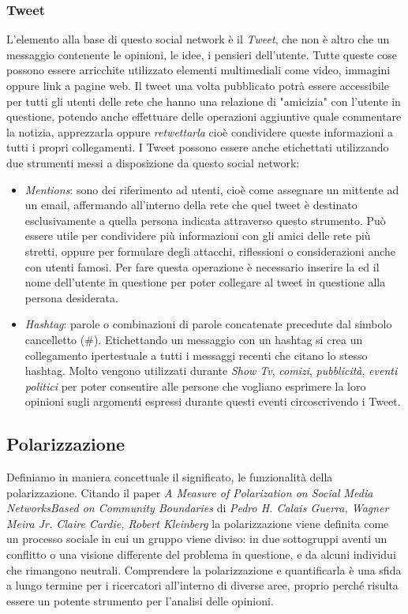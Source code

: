 \subsubsection{Tweet}
L'elemento alla base di questo social network è il \textit{Tweet}, che non è altro che un messaggio contenente le opinioni, le idee, i pensieri dell'utente. Tutte queste cose possono essere arricchite utilizzato elementi multimediali come video, immagini oppure link a pagine web. Il tweet una volta pubblicato potrà essere accessibile per tutti gli utenti delle rete che hanno una relazione di "amicizia" con l'utente in questione, potendo anche effettuare delle operazioni aggiuntive quale commentare la notizia, apprezzarla oppure \textit{retwettarla} cioè condividere queste informazioni a tutti i propri collegamenti.
I Tweet possono essere anche etichettati utilizzando due strumenti messi a disposizione da questo social network:
\begin{itemize}
\item \textit{Mentions}: sono dei riferimento ad utenti, cioè come assegnare un mittente ad un email, affermando all'interno della rete che quel tweet è destinato esclusivamente a quella persona indicata attraverso questo strumento. Può essere utile per condividere più informazioni con gli amici delle rete più stretti, oppure per formulare degli attacchi, riflessioni o considerazioni anche con utenti famosi. Per fare questa operazione è necessario inserire la \@ ed il nome dell'utente in questione per poter collegare al tweet in questione alla persona desiderata.
\item \textit{Hashtag}: parole o combinazioni di parole concatenate precedute dal simbolo cancelletto (\#).
Etichettando un messaggio con un hashtag si crea un collegamento ipertestuale a tutti i messaggi recenti che citano lo stesso hashtag. Molto  vengono utilizzati durante \textit{Show Tv}, \textit{comizi}, \textit{pubblicità}, \textit{eventi politici} per poter consentire alle persone che vogliano esprimere la loro opinioni sugli argomenti espressi durante questi eventi circoscrivendo i Tweet. 

\end{itemize}

\subsection{Polarizzazione}
Definiamo in maniera concettuale il significato, le funzionalità della polarizzazione. 
Citando il paper \textit{A Measure of Polarization on Social Media NetworksBased on Community Boundaries} di \textit{Pedro H. Calais Guerra, Wagner Meira Jr. Claire Cardie, Robert Kleinberg} la polarizzazione viene definita come un processo sociale in cui un gruppo viene diviso: 
in due sottogruppi aventi un conflitto o una visione differente del problema in questione, e da alcuni individui che rimangono neutrali.
Comprendere la polarizzazione e quantificarla è una sfida a lungo termine per i ricercatori all'interno di diverse aree, proprio perché risulta essere un potente strumento per l'analisi delle opinioni.

